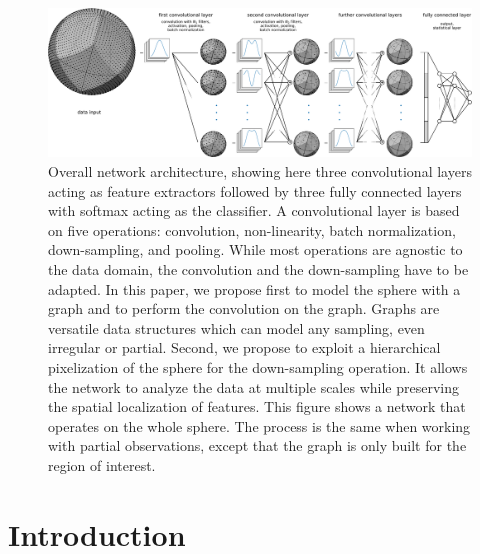 \documentclass[final,twocolumn,3p,times,sort&compress]{elsarticle}
\newcommand{\1}{\b{1}}              %
\newcommand{\0}{\b{0}}              %
\begin{document}
\begin{figure}
	\centering
	\includegraphics[width=\linewidth]{figure_architecture_v3}
	\caption{Overall network architecture, showing here three convolutional layers acting as feature extractors followed by three fully connected layers with softmax acting as the classifier.
    A convolutional layer is based on five operations: convolution, non-linearity, batch normalization, down-sampling, and pooling.
	While most operations are agnostic to the data domain, the convolution and the down-sampling have to be adapted.
	In this paper, we propose first to model the sphere with a graph and to perform the convolution on the graph.
	Graphs are versatile data structures which can model any sampling, even irregular or partial.
	Second, we propose to exploit a hierarchical pixelization of the sphere for the down-sampling operation.
	It allows the network to analyze the data at multiple scales while preserving the spatial localization of features.
	This figure shows a network that operates on the whole sphere.
	The process is the same when working with partial observations, except that the graph is only built for the region of interest.}
	\label{fig:architecture}
\end{figure}

\section{Introduction}
\label{sec:intro}

\end{document}
